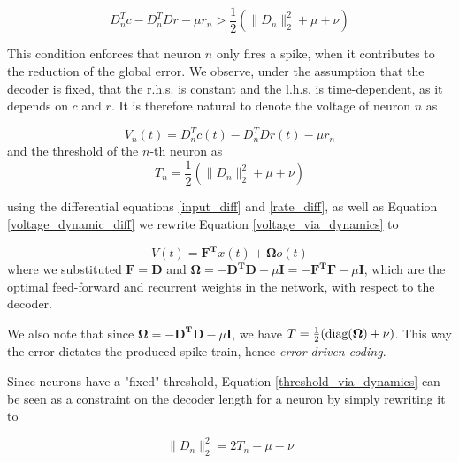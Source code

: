 \documentclass[twoside,11pt]{article}
\begin{document}
\begin{equation} \label{network_dynamics}
  D_n^Tc - D_n^TDr - \mu r_n > \frac{1}{2} (\| D_n\|^2_2 + \mu + \nu) 
\end{equation}

This condition enforces that neuron $n$ only fires a spike, when it contributes
to the reduction of the global error. We observe,
under the assumption that the decoder is fixed, that the r.h.s. is constant and the l.h.s. is 
time-dependent, as it depends on $c$ and $r$.
It is therefore natural to denote the voltage of neuron $n$ as

\begin{equation} \label{voltage_via_dynamics}
  V_n(t) = D_n^Tc(t) - D_n^TDr(t) - \mu r_n 
\end{equation}
and the threshold of the $n$-th neuron as
\begin{equation} \label{threshold_via_dynamics}
  T_n = \frac{1}{2} (\| D_n\|^2_2 + \mu + \nu)
\end{equation}

using the differential equations \ref{input_diff} and \ref{rate_diff}, as well as Equation \ref{voltage_dynamic_diff}
we rewrite Equation \ref{voltage_via_dynamics} to

\begin{equation} \label{voltage_diff_via_dynamics}
  V(t) = \mathbf{F^T}x(t) + \mathbf{\Omega} o(t)
\end{equation}
where we substituted $\mathbf{F} = \mathbf{D}$ and $\mathbf{\Omega} = -\mathbf{D^TD} - \mu \mathbf{I} = -\mathbf{F^TF} - \mu \mathbf{I}$, which are the optimal feed-forward and
recurrent weights in the network, with respect to the decoder.

We also note that since $\mathbf{\Omega} = -\mathbf{D^TD} - \mu \mathbf{I}$, we have $T = \frac{1}{2}(\textnormal{diag}(\mathbf{\Omega}) + \nu)$.
This way the error dictates the produced spike train, hence \emph{error-driven coding}.

Since neurons have a "fixed" threshold, Equation \ref{threshold_via_dynamics} can be seen
as a constraint on the decoder length for a neuron by simply rewriting it to

\begin{equation} \label{threshold_rewritten}
  \|D_n\|_2^2 = 2T_n - \mu - \nu
\end{equation} 
\end{document}
